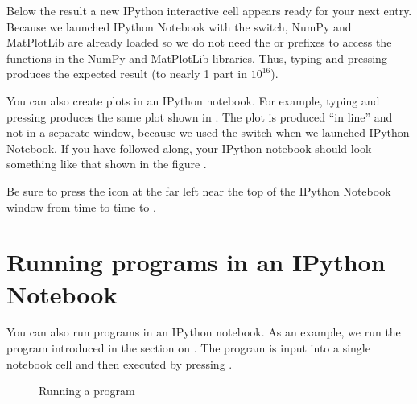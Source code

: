 \documentclass[letterpaper,10pt,english]{sphinxmanual}
\begin{document}
\sphinxAtStartPar
Below the result a new IPython interactive cell appears ready for your next entry.  Because we launched IPython Notebook with the  switch, NumPy and MatPlotLib are already loaded so we do not need the  or  prefixes to access the functions in the NumPy and MatPlotLib libraries.  Thus, typing  and pressing  produces the expected result (to nearly 1 part in \(10^{16}\)).

\sphinxAtStartPar
You can also create plots in an IPython notebook.  For example, typing  and pressing  produces  the same plot shown in {\hyperref[\detokenize{chap5/chap5_plot:fig-zigzagplotdemo}]{}}.  The plot is produced “in line” and not in a separate window, because we used the  switch when we launched IPython Notebook.  If you have followed along, your IPython notebook should look something like that shown in the figure {\hyperref[\detokenize{apdx2/apdx2_ipynb:fig-firstipynbcells}]{}}.

\sphinxAtStartPar
Be sure to press the  icon at the far left near the top of the IPython Notebook window from time to time to .


\section{Running programs in an IPython Notebook}
\label{\detokenize{apdx2/apdx2_ipynb:running-programs-in-an-ipython-notebook}}
\sphinxAtStartPar
You can also run programs in an IPython notebook.  As an example, we run the program introduced in the section on {\hyperref[\detokenize{chap4/chap4_io:screenoutput}]{}}.  The program is input into a single notebook cell and then executed by pressing .

\begin{figure}[htbp]
\centering
\capstart

\noindent{}
\caption{Running a program}\label{\detokenize{apdx2/apdx2_ipynb:id4}}\label{\detokenize{apdx2/apdx2_ipynb:fig-mileagenb}}\end{figure}
\end{document}

